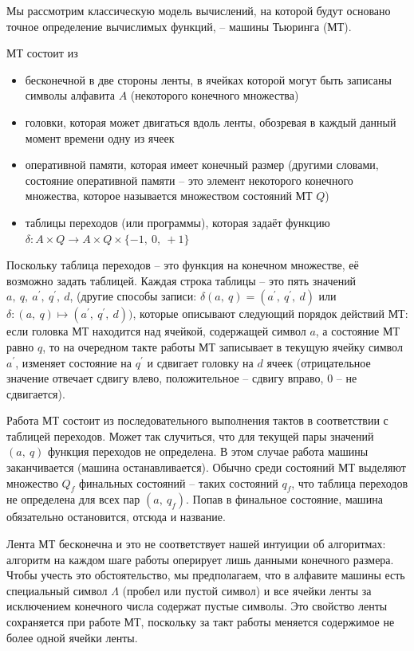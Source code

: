 \documentclass[a4paper, 12pt]{article}
\begin{document}
Мы рассмотрим классическую модель вычислений, на которой будут основано точное определение вычислимых функций, -- машины Тьюринга (МТ).

МТ состоит из

\begin{itemize}
    \item бесконечной в две стороны ленты, в ячейках которой могут быть записаны символы алфавита $A$ (некоторого конечного множества)
    \item головки, которая может двигаться вдоль ленты, обозревая в каждый данный момент времени одну из ячеек
    \item оперативной памяти, которая имеет конечный размер (другими словами, состояние оперативной памяти -- это элемент некоторого конечного множества, которое называется множеством состояний МТ $Q$)
    \item таблицы переходов (или программы), которая задаёт функцию $\delta : A \times Q \to A \times Q \times \{-1,\ 0,\ +1\}$
\end{itemize}

Поскольку таблица переходов -- это функция на конечном множестве, её возможно задать таблицей. Каждая строка таблицы -- это пять значений $a,\ q,\ a^{'},\ q^{'},\ d$, (другие способы записи: $\delta(a,\ q) = (a^{'},\ q^{'},\ d)$ или $\delta : (a,\ q) \mapsto (a^{'},\ q^{'},\ d))$, которые описывают следующий порядок действий МТ: если головка МТ находится над ячейкой, содержащей символ $a$, а состояние МТ равно $q$, то на очередном такте
работы МТ записывает в текущую ячейку символ $a^{'}$, изменяет состояние на $q^{'}$ и сдвигает головку на $d$ ячеек (отрицательное значение отвечает сдвигу влево, положительное -- сдвигу вправо, $0$ -- не сдвигается).

Работа МТ состоит из последовательного выполнения тактов в соответствии с таблицей переходов. Может так случиться, что для текущей пары значений $(a,\ q)$ функция переходов не определена. В этом случае работа машины заканчивается (машина останавливается). Обычно среди состояний МТ выделяют множество $Q_f$ финальных состояний -- таких состояний $q_f$, что таблица переходов не определена для всех пар $(a,\ q_f)$. Попав в финальное состояние, машина обязательно остановится, отсюда и название. 

Лента МТ бесконечна и это не соответствует нашей интуиции об алгоритмах: алгоритм на каждом шаге работы оперирует лишь данными конечного размера. Чтобы учесть это обстоятельство, мы предполагаем, что в алфавите машины есть специальный символ $\Lambda$ (пробел или пустой символ) и все ячейки ленты за исключением конечного числа содержат пустые символы. Это свойство ленты сохраняется при работе МТ, поскольку за такт работы меняется содержимое не более одной ячейки ленты.
\end{document}
